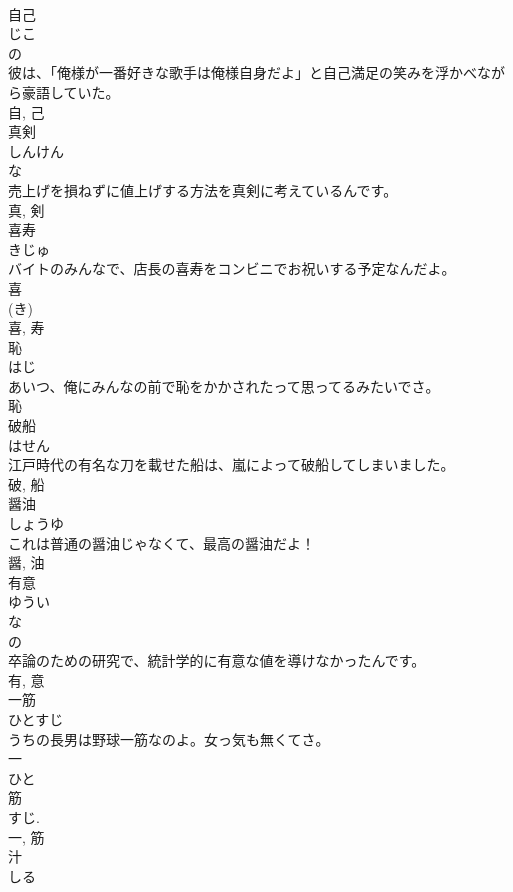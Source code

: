 \documentclass[8pt]{extreport}
\begin{document}
\begin{CJK}{UTF8}{min}
\\	自己	
\\	じこ	
\\	の 
\\	彼は、「俺様が一番好きな歌手は俺様自身だよ」と自己満足の笑みを浮かべながら豪語していた。	
\\	自, 己	
\\	真剣	
\\	しんけん	
\\	な 
\\	売上げを損ねずに値上げする方法を真剣に考えているんです。	
\\	真, 剣	
\\	喜寿	
\\	きじゅ	
\\	バイトのみんなで、店長の喜寿をコンビニでお祝いする予定なんだよ。	
\\	喜 
\\	(き) 
\\	喜, 寿	
\\	恥	
\\	はじ	
\\	あいつ、俺にみんなの前で恥をかかされたって思ってるみたいでさ。	
\\	恥	
\\	破船	
\\	はせん	
\\	江戸時代の有名な刀を載せた船は、嵐によって破船してしまいました。	
\\	破, 船	
\\	醤油	
\\	しょうゆ	
\\	これは普通の醤油じゃなくて、最高の醤油だよ！	
\\	醤, 油	
\\	有意	
\\	ゆうい	
\\	な 
\\	の 
\\	卒論のための研究で、統計学的に有意な値を導けなかったんです。	
\\	有, 意	
\\	一筋	
\\	ひとすじ	
\\	うちの長男は野球一筋なのよ。女っ気も無くてさ。	
\\	一 
\\	ひと 
\\	筋 
\\	すじ. 
\\	一, 筋	
\\	汁	
\\	しる	

\end{CJK}
\end{document}
